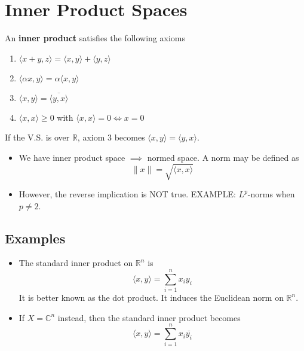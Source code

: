\documentclass{article}
\newcommand{\R}{\mathbb{R}}
\newcommand{\C}{\mathbb{C}}
\theoremstyle{plain}
\theoremstyle{definition}
\begin{document}
		\section{Inner Product Spaces}
		An \textbf{inner product} satisfies the following axioms 
		\begin{enumerate}
				\item $\langle x + y, z \rangle = \langle x, y \rangle + \langle y, z \rangle$ 
				\item $\langle \alpha x, y \rangle = \alpha \langle x, y \rangle$
				\item $\langle x, y \rangle = \overline{\langle y, x \rangle}$ 
				\item $\langle x, x \rangle \geq 0$ with $\langle x, x \rangle = 0 \iff x = 0$
		\end{enumerate}
		If the V.S. is over $\R$, axiom 3 becomes $\langle x, y \rangle = \langle y, x \rangle$.
		\begin{itemize}
				\item We have inner product space $\implies$ normed space. A norm may be defined as 
						\begin{equation*}
								\|x\| = \sqrt{\langle x, x\rangle}
						\end{equation*}
				\item However, the reverse implication is NOT true. EXAMPLE: $L^p$-norms when $p\neq 2$. 
		\end{itemize}

		\subsection{Examples}
		\begin{itemize}
				\item The standard inner product on $\R^n$ is 
						\begin{equation*}
								\langle x, y \rangle = \sum_{i=1}^{n} x_i y_i
						\end{equation*}
						It is better known as the dot product. It induces the Euclidean norm on $\R^n$. 

				\item If $X = \C^n$ instead, then the standard inner product becomes 
						\begin{equation*}
								\langle x, y \rangle = \sum_{i=1}^{n} x_i \overline{y_i}
						\end{equation*}
		\end{itemize}
\end{document}
